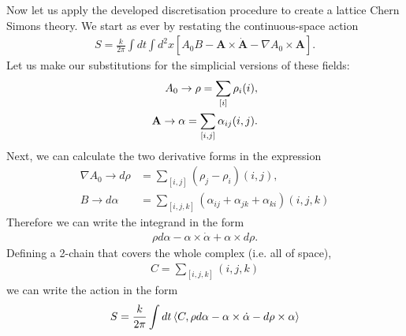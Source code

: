 \documentclass[11pt, oneside]{article} %
\numberwithin{equation}{section}
\begin{document}
Now let us apply the developed discretisation procedure to create  a lattice Chern Simons theory. We start as ever by restating the continuous-space action
\begin{align}
    S = \frac{k}{2\pi}
    \int dt \int d^2x
    \left [  
    A_0  B -
    \textbf {A} \times \dot {\textbf {A}} -
    \nabla A_0  \times  \textbf {A}
    \right ].
\end{align}
Let us make our substitutions for the simplicial versions of these fields:
\begin{align}
    A_0 \rightarrow \rho = \sum_{[i]}\rho_i(i),\\
    \textbf A \rightarrow \alpha = \sum_{[i,j]}\alpha_{ij} (i,j).
\end{align}
Next, we can calculate the two derivative forms in the expression
\begin{align}
    \nabla A_0 \rightarrow d\rho &= \sum_{[i,j]}(\rho_j - \rho_i) (i,j),\\
    B \rightarrow d\alpha  &= \sum_{[i,j,k]} ( \alpha_{ij} + \alpha_{jk} + \alpha_{ki}) (i,j,k)
\end{align}
Therefore we can write the integrand in the form
\begin{align}
    \rho d\alpha - \alpha \times \dot \alpha + \alpha 
    \times d\rho. 
\end{align}
Defining a 2-chain that covers the whole complex (i.e. all of space),
\begin{align}
    C = \sum_{[i,j,k]} (i,j,k)
\end{align}
we can write the action in the form
\begin{align}
    S = \frac k{2\pi} \int dt \left \langle C, 
    \rho d\alpha 
    - \alpha \times \dot \alpha 
    -  d\rho \times \alpha
     \right \rangle
\end{align}
\end{document}
